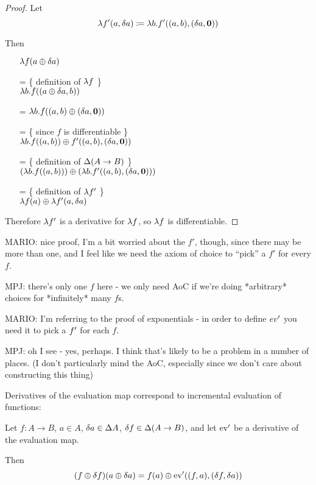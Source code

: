 \begin{proof}
  Let
  $$\lambda f'(a, \delta a) \coloneqq \lambda b. f'((a, b),
  (\delta a, \textbf{0}))$$
  
  Then
  \begin{itemize}
    \item[ ]$\lambda f(a \oplus \delta a)$
    \item[=]\{ definition of $\lambda f$ \}\\
      $\lambda b. f((a \oplus \delta a, b))$
    \item[=] $\lambda b. f((a, b) \oplus (\delta a, \textbf{0}))$
    \item[=]\{ since $f$ is differentiable \}\\
      $\lambda b. f((a, b)) \oplus f'((a, b), (\delta a, \textbf{0}))$
    \item[=]\{ definition of $\Delta (A \rightarrow B)$ \}\\
      $(\lambda b. f((a, b))) \oplus (\lambda b. f'((a, b), (\delta a, \textbf{0})))$
    \item[=]\{ definition of $\lambda f'$ \}\\
      $\lambda f(a) \oplus \lambda f'(a, \delta a)$
  \end{itemize}

  Therefore $\lambda f'$ is a derivative for $\lambda f$, so $\lambda f$
  is differentiable.
\end{proof}

MARIO: nice proof, I'm a bit worried about the $f'$, though, since there may be more than one,
and I feel like we need the axiom of choice to ``pick'' a $f'$ for every $f$.

MPJ: there's only one $f$ here - we only need AoC if we're doing *arbitrary*
choices for *infinitely* many $f$s.

MARIO: I'm referring to the proof of exponentials - in order to define $ev'$ you
need it to pick a $f'$ for each $f$.

MPJ: oh I see - yes, perhaps. I think that's likely to be a problem in a number
of places. (I don't particularly mind the AoC, especially since we don't care
about constructing this thing)

Derivatives of the evaluation map correspond to incremental evaluation of functions:

\begin{prop}[Incrementalization]
\label{prop:incrementalization}
  Let $f: A \rightarrow B$, $a \in A$, $\delta a \in
  \Delta A$, $\delta f \in \Delta (A \rightarrow B)$, and let
  $\operatorname{ev}'$ be a derivative of the evaluation map.

  Then 
  $$(f \oplus \delta f)(a \oplus \delta a) = f(a) \oplus \operatorname{ev}'((f, a), (\delta f, \delta a))$$
\end{prop}

